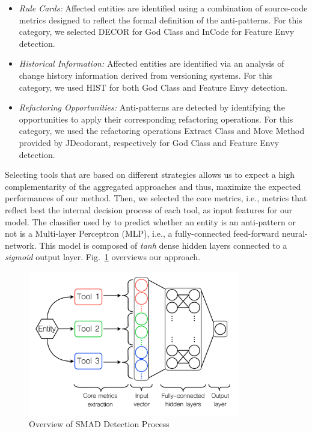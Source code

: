 \begin{itemize}
\item \textit{Rule Cards:} Affected entities are identified using a combination of source-code metrics designed to reflect the formal definition of the anti-patterns. For this category, we selected DECOR \cite{Moha10-TSE-DECOR} for God Class and InCode \cite{marinescu2010incode} for Feature Envy detection.  

\item \textit{Historical Information:} Affected entities are identified via an analysis of change history information derived from versioning systems. For this category, we used HIST \cite{PalombaBPOLP13,Palomba15} for both God Class and Feature Envy detection.

\item \textit{Refactoring Opportunities:} Anti-patterns are detected by identifying the opportunities to apply their corresponding refactoring operations. For this category, we used the refactoring operations Extract Class \cite{fokaefs2012identification} and Move Method \cite{tsantalis2009identification} provided by JDeodorant, respectively for God Class and Feature Envy detection.
\end{itemize}

Selecting tools that are based on different strategies allows us to expect a high complementarity of the aggregated approaches and thus, maximize the expected performances of our method. Then, we selected the core metrics, i.e., metrics that reflect best the internal decision process of each tool, as input features for our model. The classifier used by \NAME{} to predict whether an entity is an anti-pattern or not is a Multi-layer Perceptron (MLP), i.e., a fully-connected feed-forward neural-network. This model is composed of \textit{tanh} dense hidden layers connected to a \textit{sigmoid} output layer. Fig.~\ref{fig: smad} overviews our approach. 


\begin{figure}[htb]
\centering
\includegraphics[width=9.2cm]{images/SMAD}
\caption{Overview of SMAD Detection Process}
\label{fig: smad}
\end{figure}

